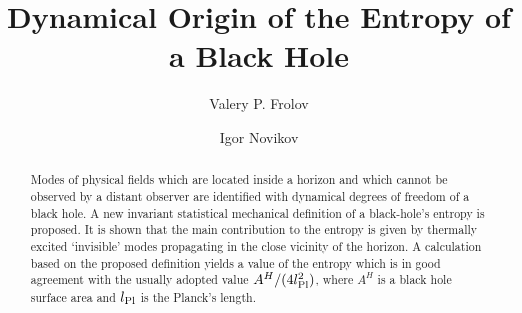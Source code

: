 \documentclass[superscriptaddress,showpacs,preprintnumbers,amsmath,amssymb,
nofootinbib,twocolumn,aps,prd,10pt]{revtex4-1}
\begin{document}
\title{Dynamical Origin of the Entropy of a Black Hole}

\author{Valery P. Frolov}
\author{Igor Novikov}





\begin{abstract}
Modes of physical fields which are located inside a horizon and  which
cannot be observed by a distant observer are identified with dynamical
degrees  of  freedom  of  a  black  hole.  A new invariant statistical
mechanical definition  of a  black-hole's  entropy  is  proposed.   It
is   shown   that   the main  contribution to  the entropy is given by
thermally excited  `invisible' modes propagating in the close vicinity
of  the  horizon.  A   calculation  based  on  the proposed definition
yields a value of the  entropy which is   in   good  agreement    with
the   usually  adopted    value $A^H /(4l^2_{\mbox{\scriptsize{Pl}}})$,
where  $A^H$ is  a  black  hole  surface  area  and
$l_{\mbox{\scriptsize{Pl}}}$ is the Planck's length.
\end{abstract}
\end{document}
